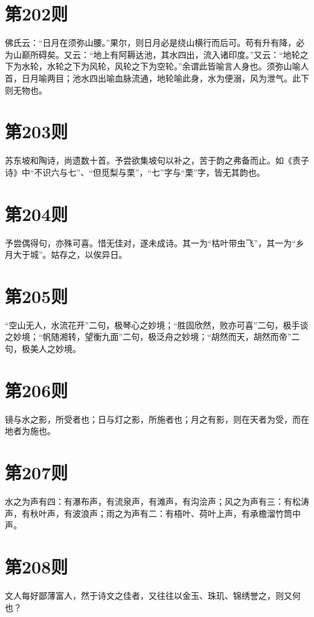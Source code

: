\documentclass[12pt,a4paper]{ctexbook}
\begin{document}
\section{第202则}
佛氏云：“日月在须弥山腰。”果尔，则日月必是绕山横行而后可。苟有升有降，必为山巅所碍矣。又云：“地上有阿耨达池，其水四出，流入诸印度。”又云：“地轮之下为水轮，水轮之下为风轮，风轮之下为空轮。”余谓此皆喻言人身也。须弥山喻人首，日月喻两目；池水四出喻血脉流通，地轮喻此身，水为便溺，风为泄气。此下则无物也。\par

\section{第203则}
苏东坡和陶诗，尚遗数十首。予尝欲集坡句以补之，苦于韵之弗备而止。如《责子诗》中“不识六与七”、“但觅梨与栗”，“七”字与“栗”字，皆无其韵也。\par

\section{第204则}
予尝偶得句，亦殊可喜。惜无佳对，遂未成诗。其一为“枯叶带虫飞”，其一为“乡月大于城”。姑存之，以俟异日。\par

\section{第205则}
“空山无人，水流花开”二句，极琴心之妙境；“胜固欣然，败亦可喜”二句，极手谈之妙境；“帆随湘转，望衡九面”二句，极泛舟之妙境；“胡然而天，胡然而帝”二句，极美人之妙境。\par

\section{第206则}
镜与水之影，所受者也；日与灯之影，所施者也；月之有影，则在天者为受，而在地者为施也。\par

\section{第207则}
水之为声有四：有瀑布声，有流泉声，有滩声，有沟浍声；风之为声有三：有松涛声，有秋叶声，有波浪声；雨之为声有二：有梧叶、荷叶上声，有承檐溜竹筒中声。\par

\section{第208则}
文人每好鄙薄富人，然于诗文之佳者，又往往以金玉、珠玑、锦绣誉之，则又何也？\par
\end{document}

